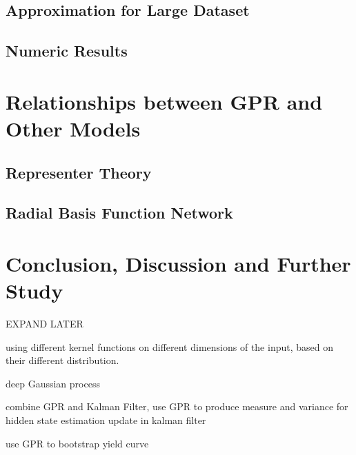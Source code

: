 \documentclass[11pt,a4paper]{article}
\theoremstyle{definition}
\numberwithin{equation}{section}
\begin{document}
\subsection{Approximation for Large Dataset}

\subsection{Numeric Results}

\newpage
\section{Relationships between GPR and Other Models}

\subsection{Representer Theory}

\subsection{Radial Basis Function Network}

\newpage
\section{Conclusion, Discussion and Further Study}

EXPAND LATER

using different kernel functions on different dimensions of the input, based on their different distribution.

deep Gaussian process

combine GPR and Kalman Filter, use GPR to produce measure and variance for hidden state estimation update in kalman filter

use GPR to bootstrap yield curve


\end{document}
